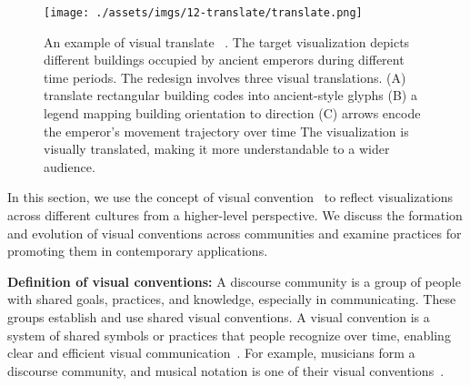 \begin{figure}[!htb]
    \centering
    \texttt{[image: ./assets/imgs/12-translate/translate.png]}
    \caption{
        An example of visual translate ~\cite{Baur2020Visual}.
        The target visualization depicts different buildings occupied by ancient emperors during different time periods. 
        The redesign involves three visual translations.
        (A) translate rectangular building codes into ancient-style glyphs
        (B) a legend mapping building orientation to direction
        (C) arrows encode the emperor's movement trajectory over time
        The visualization is visually translated, making it more understandable to a wider audience.
    }
    \label{fig:translate}
\end{figure}

In this section, we use the concept of visual convention~\cite{Kostelnick2003Shaping} to reflect visualizations across different cultures from a higher-level perspective.
We discuss the formation and evolution of visual conventions across communities and examine practices for promoting them in contemporary applications.

\textbf{Definition of visual conventions:}
A discourse community is a group of people with shared goals, practices, and knowledge, especially in communicating.
These groups establish and use shared visual conventions. 
A visual convention is a system of shared symbols or practices that people recognize over time, enabling clear and efficient visual communication~\cite{Kostelnick2003Shaping}.
For example, musicians form a discourse community, and musical notation is one of their visual conventions~\cite{Kostelnick2003Shaping}.

